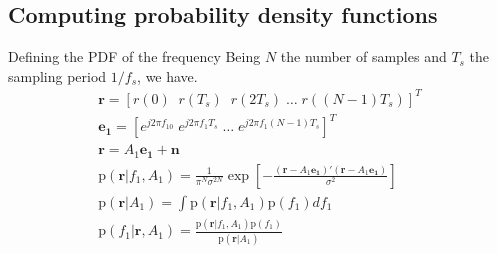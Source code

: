﻿\documentclass[mathserif]{beamer}
\begin{document}
	
	
	\subsection{Computing probability density functions}
	\begin{frame}{Defining the PDF of the frequency}
		Being $N$ the number of samples and $T_s$ the sampling period $1/f_s$, we have.
		\begin{gather*}
			\mathbf{r} =  [r(0) \; \; r(T_s) \; \; r(2T_s) \; \dots \; r((N-1)T_s)]^T \\
			\mathbf{e_1} =  [e^{j2\pi f_10} \; e^{j2\pi f_1T_s} \; \dots \; e^{j2\pi f_1(N-1)T_s}]^T \\		
			\mathbf{r} = A_1\mathbf{e_1} + \mathbf{n} \\
			\mathrm{p}(\mathbf{r}|f_1,A_1) = \frac{1}{\pi^N\sigma^{2N}}\exp\left[-\frac{(\mathbf{r}-A_1\mathbf{e_1})'
				(\mathbf{r}-A_1\mathbf{e_1})}{\sigma^2}\right] \\
			\mathrm{p}(\mathbf{r}|A_1) = \int \mathrm{p}(\mathbf{r}|f_1,A_1)\mathrm{p}(f_1)df_1\\
			\mathrm{p}(f_1|\mathbf{r},A_1) = \frac{\mathrm{p}(\mathbf{r}|f_1,A_1)\mathrm{p}(f_1)}{\mathrm{p}(\mathbf{r}|A_1)} \\
		\end{gather*}
	\end{frame}
	
	

	
\end{document}
